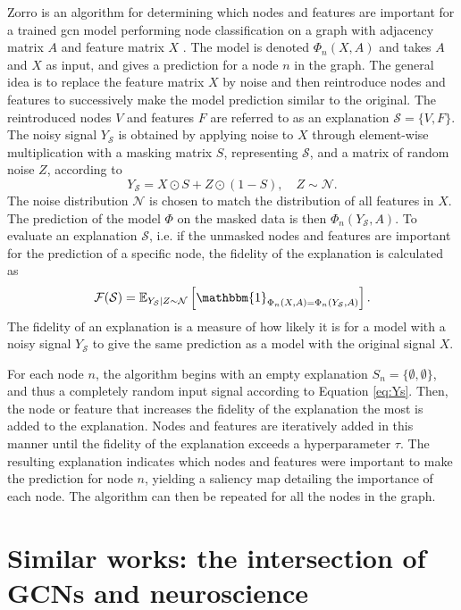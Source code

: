 Zorro is an algorithm for determining which nodes and features are important for a trained \acrshort{gcn} model performing node classification on a graph with adjacency matrix $A$ and feature matrix $X$ \cite{zorro}. The model is denoted $\Phi_n(X,A)$ and takes $A$ and $X$ as input, and gives a prediction for a node $n$ in the graph. The general idea is to replace the feature matrix $X$ by noise and then reintroduce nodes and features to successively make the model prediction similar to the original. The reintroduced nodes $V$ and features $F$ are referred to as an explanation $\mathcal{S} = \{V, F\}$. The noisy signal $Y_{\mathcal{S}}$ is obtained by applying noise to $X$ through element-wise multiplication with a masking matrix $S$, representing $\mathcal{S}$, and a matrix of random noise $Z$, according to
\begin{equation}
    Y_\mathcal{S} = X \odot S + Z \odot (1- S), \quad Z \sim \mathcal{N}.
\end{equation}
The noise distribution $\mathcal{N}$ is chosen to match the distribution of all features in $X$. The prediction of the model $\Phi$ on the masked data is then $\Phi_n(Y_{\mathcal{S}}, A)$. To evaluate an explanation $\mathcal{S}$, i.e. if the unmasked nodes and features are important for the prediction of a specific node, the fidelity of the explanation is calculated as
\begin{equation}
    \mathcal{F}(\mathcal{S}) = \mathbb{E}_{Y_{\mathcal{S}}|Z\sim\mathcal{N}}\left[\mathbbm{1}_{\Phi_n(X,A) = \Phi_n(Y_{\mathcal{S}},A)}\right].
    \label{eq:Ys}
\end{equation}
The fidelity of an explanation is a measure of how likely it is for a model with a noisy signal $Y_{\mathcal{S}}$ to give the same prediction as a model with the original signal $X$.

For each node $n$, the algorithm begins with an empty explanation $S_n = \{\emptyset, \emptyset\}$, and thus a completely random input signal according to Equation \eqref{eq:Ys}. Then, the node or feature that increases the fidelity of the explanation the most is added to the explanation. Nodes and features are iteratively added in this manner until the fidelity of the explanation exceeds a hyperparameter $\tau$. The resulting explanation indicates which nodes and features were important to make the prediction for node $n$, yielding a saliency map detailing the importance of each node. The algorithm can then be repeated for all the nodes in the graph.

\section{Similar works: the intersection of GCNs and neuroscience}

